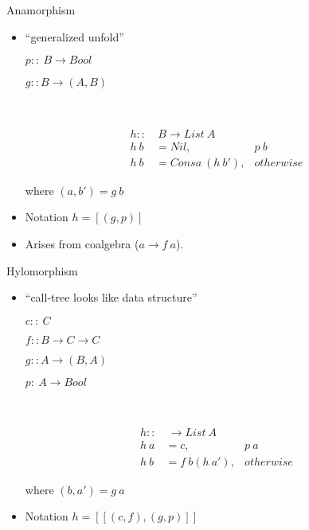 \documentclass{beamer}
\begin{document}
\begin{frame}{Anamorphism}
\begin{itemize}
\item ``generalized unfold''

$p::\ B\rightarrow Bool$

$g:: B \rightarrow (A,B)$ 


~

\begin{align*}
h::&\  B \rightarrow List\ A\\ 
h\ b &= Nil, & p \ b \\
h\ b &=  Cons a\ (h\ b'),& otherwise
\end{align*}

where $(a,b') = g\ b $



\item Notation $h = [\!(g,p)\!]$
\item Arises from coalgebra ($a \rightarrow f\ a$).
\end{itemize}

\end{frame}

\begin{frame}{Hylomorphism}
\begin{itemize}
\item ``call-tree looks like data structure''

$c::\ C$

$f:: B\rightarrow C \rightarrow C$ 

$g:: A \rightarrow (B,A)$


$p:\ A\rightarrow Bool$

~

\begin{align*}
h::&\   \rightarrow List\ A\\ 
h\ a &= c, & p \ a \\
h\ b &= f\ b (h\ a'), & otherwise
\end{align*}

where $(b, a') = g\ a$



\item Notation $h = [\![(c,f), (g,p)]\!]$
\end{itemize}

\end{frame}
\end{document}
